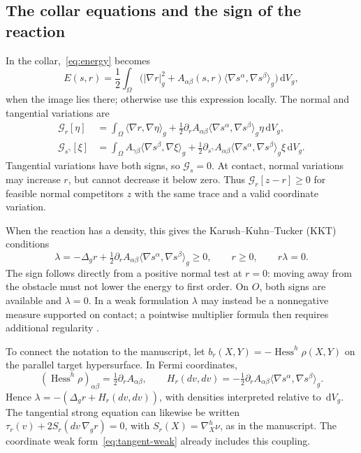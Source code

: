 \documentclass[11pt,a4paper]{article}
\newcommand{\dd}{\,\mathrm d}
\newcommand{\ip}[2]{\langle #1,#2\rangle_g}
\newcommand{\Hess}{\operatorname{Hess}}
\begin{document}
\subsection{The collar equations and the sign of the reaction}
In the collar,~\eqref{eq:energy} becomes
\begin{equation}
 E(s,r)=\frac12\int_\Omega
 \bigl(|\nabla r|_g^2+A_{\alpha\beta}(s,r)
 \ip{\nabla s^\alpha}{\nabla s^\beta}\bigr)\dd V_g,
 \label{eq:split-energy}
\end{equation}
when the image lies there; otherwise use this expression locally.
The normal and tangential variations are
\begin{align}
 \mathcal G_r[\eta]&=\int_\Omega
 \ip{\nabla r}{\nabla\eta}
 +\tfrac12\partial_rA_{\alpha\beta}
 \ip{\nabla s^\alpha}{\nabla s^\beta}\eta\dd V_g,
 \label{eq:normal-weak}\\
 \mathcal G_{s^\gamma}[\xi]&=\int_\Omega
 A_{\gamma\beta}\ip{\nabla s^\beta}{\nabla\xi}
 +\tfrac12\partial_{s^\gamma}A_{\alpha\beta}
 \ip{\nabla s^\alpha}{\nabla s^\beta}\xi\dd V_g.
 \label{eq:tangent-weak}
\end{align}
Tangential variations have both signs, so \(\mathcal G_s=0\). At contact,
normal variations may increase \(r\), but cannot decrease it below zero.
Thus \(\mathcal G_r[z-r]\geq0\) for feasible normal competitors \(z\)
with the same trace and a valid coordinate variation.

When the reaction has a density, this gives the Karush--Kuhn--Tucker
(KKT) conditions
\begin{equation}
 \boxed{\quad
 \lambda=-\Delta_g r+\tfrac12\partial_rA_{\alpha\beta}
 \ip{\nabla s^\alpha}{\nabla s^\beta}\geq0,
 \qquad r\geq0,\qquad r\lambda=0.\quad}
 \label{eq:kkt}
\end{equation}
The sign follows directly from a positive normal test at \(r=0\): moving
away from the obstacle must not lower the energy to first order. On \(O\),
both signs are available and \(\lambda=0\). In a weak formulation \(\lambda\)
may instead be a nonnegative measure supported on contact; a pointwise
multiplier formula then requires additional regularity \cite{regularity}.

To connect the notation to the manuscript, let
\(b_r(X,Y)=-\Hess^h\rho(X,Y)\) on the parallel target hypersurface.
In Fermi coordinates,
\begin{equation}
 (\Hess^h\rho)_{\alpha\beta}=\tfrac12\partial_r A_{\alpha\beta},
 \qquad
 H_r(dv,dv)=-\tfrac12\partial_r A_{\alpha\beta}
 \ip{\nabla s^\alpha}{\nabla s^\beta}.
\end{equation}
Hence \(\lambda=-(\Delta_g r+H_r(dv,dv))\), with densities interpreted
relative to \(\dd V_g\). The tangential strong equation can likewise be
written \(\tau_r(v)+2S_r(dv\,\nabla_g r)=0\), with
\(S_r(X)=\nabla^h_X\nu\), as in the manuscript. The coordinate weak
form~\eqref{eq:tangent-weak} already includes this coupling.
\end{document}
